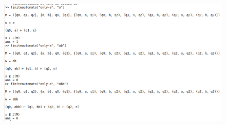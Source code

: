 \documentclass[11pt]{article}
\begin{document}
\begin{figure}[htp]
\centering
\includegraphics[scale=0.5]{test-only-a-octave.png}
\label{}
\end{figure}
\end{document}
